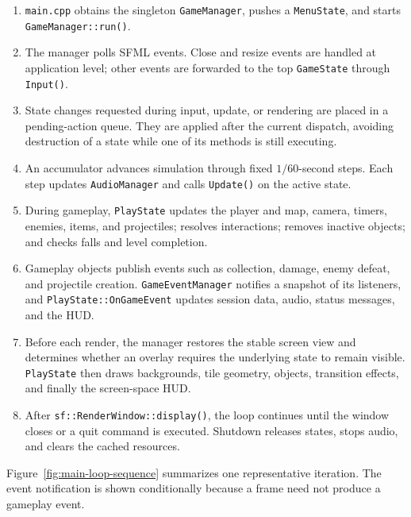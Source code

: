 \documentclass{template}
\begin{document}
\begin{enumerate}
    \item \texttt{main.cpp} obtains the singleton \texttt{GameManager}, pushes
          a \texttt{MenuState}, and starts \texttt{GameManager::run()}.
    \item The manager polls SFML events. Close and resize events are handled at
          application level; other events are forwarded to the top
          \texttt{GameState} through \texttt{Input()}.
    \item State changes requested during input, update, or rendering are placed
          in a pending-action queue. They are applied after the current
          dispatch, avoiding destruction of a state while one of its methods is
          still executing.
    \item An accumulator advances simulation through fixed
          $1/60$-second steps. Each step updates \texttt{AudioManager} and calls
          \texttt{Update()} on the active state.
    \item During gameplay, \texttt{PlayState} updates the player and map,
          camera, timers, enemies, items, and projectiles; resolves interactions;
          removes inactive objects; and checks falls and level completion.
    \item Gameplay objects publish events such as collection, damage, enemy
          defeat, and projectile creation. \texttt{GameEventManager} notifies a
          snapshot of its listeners, and \texttt{PlayState::OnGameEvent}
          updates session data, audio, status messages, and the HUD.
    \item Before each render, the manager restores the stable screen view and
          determines whether an overlay requires the underlying state to remain
          visible. \texttt{PlayState} then draws backgrounds, tile geometry,
          objects, transition effects, and finally the screen-space HUD.
    \item After \texttt{sf::RenderWindow::display()}, the loop continues until
          the window closes or a quit command is executed. Shutdown releases
          states, stops audio, and clears the cached resources.
\end{enumerate}

Figure~\ref{fig:main-loop-sequence} summarizes one representative iteration.
The event notification is shown conditionally because a frame need not produce
a gameplay event.
\end{document}
